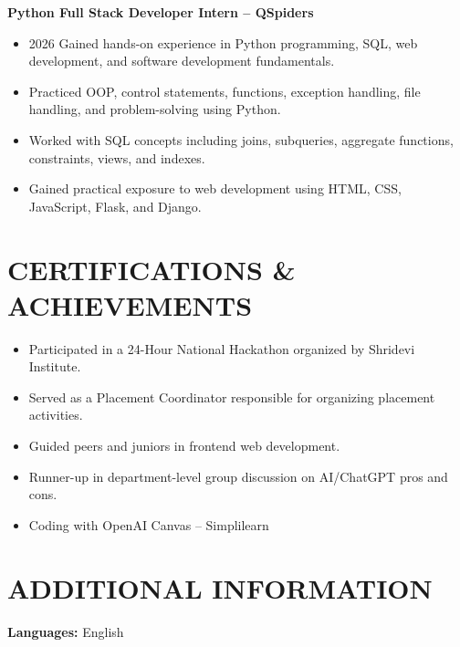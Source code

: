 \documentclass[9pt,a4paper]{extarticle}
\begin{document}
\noindent \textbf{Python Full Stack Developer Intern – QSpiders}\vspace{1pt}\\
\begin{itemize}[leftmargin=*, parsep=0pt, itemsep=1pt, topsep=1pt]
    \item 2026 Gained hands-on experience in Python programming, SQL, web development, and software development fundamentals.
    \item Practiced OOP, control statements, functions, exception handling, file handling, and problem-solving using Python.
    \item Worked with SQL concepts including joins, subqueries, aggregate functions, constraints, views, and indexes.
    \item Gained practical exposure to web development using HTML, CSS, JavaScript, Flask, and Django.
\end{itemize}



\section*{CERTIFICATIONS \& ACHIEVEMENTS}

\begin{itemize}[leftmargin=*, parsep=0pt, itemsep=1pt, topsep=1pt]
    \item Participated in a 24-Hour National Hackathon organized by Shridevi Institute.
    \item Served as a Placement Coordinator responsible for organizing placement activities.
    \item Guided peers and juniors in frontend web development.
    \item Runner-up in department-level group discussion on AI/ChatGPT pros and cons.
    \item Coding with OpenAI Canvas – Simplilearn
\end{itemize}



\section*{ADDITIONAL INFORMATION}

\textbf{Languages:} English
\end{document}
